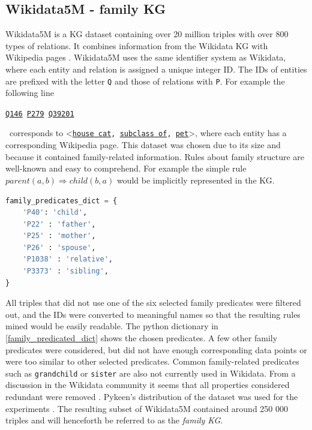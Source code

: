 \subsection{Wikidata5M - family KG}
Wikidata5M is a KG dataset containing over 20 million triples with over 800 types of relations. It combines information from the Wikidata KG with Wikipedia pages \cite{wang2019kepler}. Wikidata5M uses the same identifier system as Wikidata, where each entity and relation is assigned a unique integer ID. The IDs of entities are prefixed with the letter \texttt{Q} and those of relations with \texttt{P}. For example the following line \\
\centerline{\texttt{\href{https://www.wikidata.org/wiki/Q146}{Q146} \quad \href{https://www.wikidata.org/wiki/Property:P279}{P279} \quad  \href{https://www.wikidata.org/wiki/Q39201}{Q39201}}} \
corresponds to \textless\texttt{\href{https://www.wikidata.org/wiki/Q146}{house cat}, \href{https://www.wikidata.org/wiki/Property:P279}{subclass of}, \href{https://www.wikidata.org/wiki/Q39201}{pet}}\textgreater, where each entity has a corresponding Wikipedia page.
This dataset was chosen due to its size and because it contained family-related information. Rules about family structure are well-known and easy to comprehend. For example the simple rule $parent(a, b) \Rightarrow  child(b, a)$ would be implicitly represented in the KG.
\begin{lstlisting}[float, language=Python, caption={Python dictionary converting family predicate IDs to their names.},captionpos=t, label={family_predicated_dict}]
family_predicates_dict = {
    'P40': 'child', 
    'P22' : 'father', 
    'P25' : 'mother',
    'P26' : 'spouse', 
    'P1038' : 'relative', 
    'P3373' : 'sibling', 
}
\end{lstlisting}

All triples that did not use one of the six selected family predicates were filtered out, and the IDs were converted to meaningful names so that the resulting rules mined would be easily readable. The python dictionary in \cref{family_predicated_dict} shows the chosen predicates. A few other family predicates were considered, but did not have enough corresponding data points or were too similar to other selected predicates. Common family-related predicates such as \texttt{grandchild} or \texttt{sister} are also not currently used in Wikidata. From a discussion in the Wikidata community it seems that all properties considered redundant were removed \cite{kinship_discussion}. Pykeen's distribution of the dataset was used for the experiments \cite{ali2021pykeen}. The resulting subset of Wikidata5M contained around 250 000 triples and will henceforth be referred to as the \textit{family KG}.

